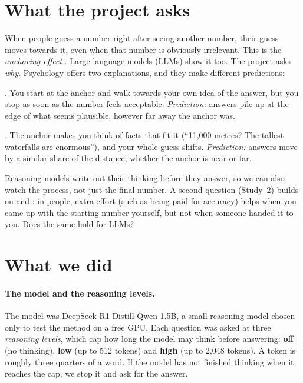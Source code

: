 \documentclass[11pt,a4paper]{article}
\begin{document}
\section{What the project asks}

When people guess a number right after seeing another number, their guess moves towards it, even when that number is obviously irrelevant. This is the \emph{anchoring effect} \citep{tversky1974judgment}. Large language models (LLMs) show it too. The project asks \emph{why}. Psychology offers two explanations, and they make different predictions:

\begin{description}[leftmargin=1.2em]
  \item[Adjusting] \citep{tversky1974judgment,epley2006anchoring}. You start at the anchor and walk towards your own idea of the answer, but you stop as soon as the number feels acceptable. \emph{Prediction:} answers pile up at the edge of what seems plausible, however far away the anchor was.
  \item[Retrieving] \citep{strack1997explaining,mussweiler1999hypothesis}. The anchor makes you think of facts that fit it (\enquote{11,000 metres? The tallest waterfalls are enormous}), and your whole guess shifts. \emph{Prediction:} answers move by a similar share of the distance, whether the anchor is near or far.
\end{description}

\noindent Reasoning models write out their thinking before they answer, so we can also watch the process, not just the final number. A second question (Study~2) builds on \citet{epley2001putting} and \citet{epley2005effortful}: in people, extra effort (such as being paid for accuracy) helps when you came up with the starting number yourself, but not when someone handed it to you. Does the same hold for LLMs?

\section{What we did}

\paragraph{The model and the reasoning levels.} The model was DeepSeek-R1-Distill-Qwen-1.5B, a small reasoning model chosen only to test the method on a free GPU. Each question was asked at three \emph{reasoning levels}, which cap how long the model may think before answering: \textbf{off} (no thinking), \textbf{low} (up to 512 tokens) and \textbf{high} (up to 2,048 tokens). A token is roughly three quarters of a word. If the model has not finished thinking when it reaches the cap, we stop it and ask for the answer.
\end{document}

